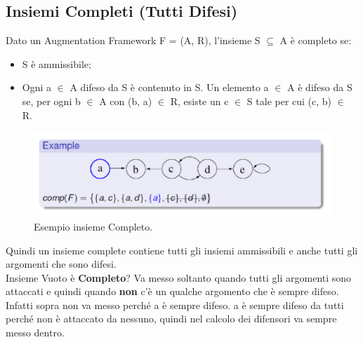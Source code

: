 \subsection{Insiemi Completi (Tutti Difesi)}
Dato un Augmentation Framework F = (A, R), l'insieme S $\subseteq$ A è completo se:
\begin{itemize}
    \item S è ammissibile;
    \item Ogni a $\in$ A difeso da S è contenuto in S. Un elemento a $\in$ A è difeso da S se, per ogni b $\in$ A con (b, a) $\in$ R, esiste un c $\in$ S tale per cui (c, b) $\in$ R.
\end{itemize}
\begin{figure}[H]
    \centering
    \includegraphics[width=12cm, keepaspectratio]{img/Cap6/completo.png}
    \caption{Esempio insieme Completo.}
\end{figure}
Quindi un insieme complete contiene tutti gli insiemi ammissibili e anche tutti gli argomenti che sono difesi.
\\Insieme Vuoto è \textbf{Completo}? Va messo soltanto quando tutti gli argomenti sono attaccati e quindi quando \textbf{non} c'è un qualche argomento che è sempre difeso.
\\Infatti sopra non va messo perché a è sempre difeso. a è sempre difeso da tutti perché non è attaccato da nessuno, quindi nel calcolo dei difensori va sempre messo dentro.
